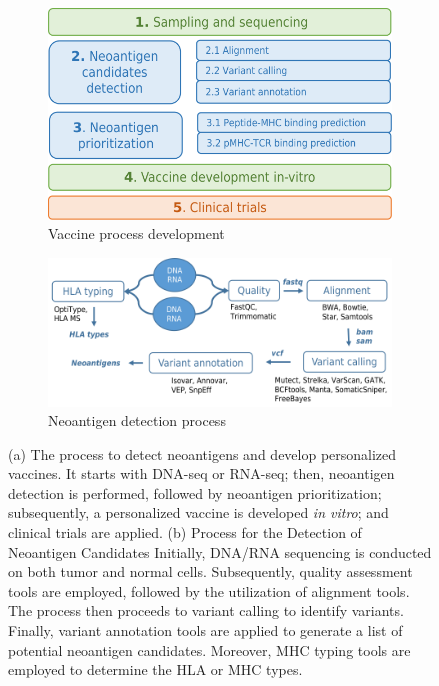 \begin{figure}[h]
	
	\begin{subfigure}[b]{0.4\textwidth}
		\centering
		\includegraphics[width=\textwidth]{../img/proposal/vaccine_pipeline}
		\caption{Vaccine process development}
		\label{fig:pipeline_a}
	\end{subfigure}
	\hfill
	\begin{subfigure}[b]{0.55\textwidth}
		\centering
		\includegraphics[width=\textwidth]{../img/proposal/neoantigen_detection}
		\caption{Neoantigen detection process}
		\label{fig:pipeline_b}
	\end{subfigure}
	\hfill
	
	\caption{(a) The process to detect neoantigens and develop personalized vaccines. It starts with DNA-seq or RNA-seq; then, neoantigen detection is performed, followed by neoantigen prioritization; subsequently, a personalized vaccine is developed \textit{in vitro}; and clinical trials are applied. (b) Process for the Detection of Neoantigen Candidates Initially, DNA/RNA sequencing is conducted on both tumor and normal cells. Subsequently, quality assessment tools are employed, followed by the utilization of alignment tools. The process then proceeds to variant calling to identify variants. Finally, variant annotation tools are applied to generate a list of potential neoantigen candidates. Moreover, MHC typing tools are employed to determine the HLA or MHC types.}
	\label{fig:pipeline}
\end{figure}


